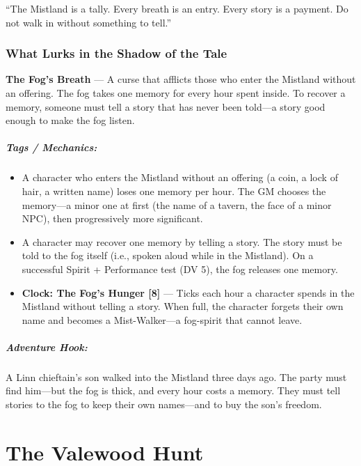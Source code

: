 \documentclass[9pt,a5paper]{extbook}
\begin{document}
``The Mistland is a tally. Every breath is an entry. Every story is a payment. Do not walk in without something to tell.''

\subsection*{What Lurks in the Shadow of the Tale}

\textbf{The Fog's Breath} --- A curse that afflicts those who enter the Mistland without an offering. The fog takes one memory for every hour spent inside. To recover a memory, someone must tell a story that has never been told---a story good enough to make the fog listen.

\paragraph{Tags / Mechanics:}
\begin{itemize}
    \item A character who enters the Mistland without an offering (a coin, a lock of hair, a written name) loses one memory per hour. The GM chooses the memory---a minor one at first (the name of a tavern, the face of a minor NPC), then progressively more significant.
    \item A character may recover one memory by telling a story. The story must be told to the fog itself (i.e., spoken aloud while in the Mistland). On a successful Spirit + Performance test (DV 5), the fog releases one memory.
    \item \textbf{Clock: The Fog's Hunger [8]} --- Ticks each hour a character spends in the Mistland without telling a story. When full, the character forgets their own name and becomes a Mist-Walker---a fog-spirit that cannot leave.
\end{itemize}

\paragraph{Adventure Hook:}
A Linn chieftain's son walked into the Mistland three days ago. The party must find him---but the fog is thick, and every hour costs a memory. They must tell stories to the fog to keep their own names---and to buy the son's freedom.

\clearpage

\chapter{The Valewood Hunt}
\end{document}
